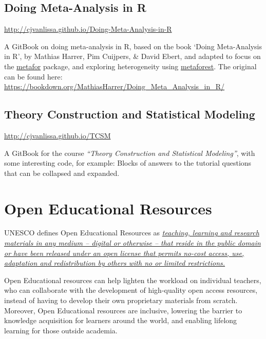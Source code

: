 \documentclass[
]{book}
\begin{document}
\hypertarget{doing-meta-analysis-in-r}{%
\section{Doing Meta-Analysis in R}\label{doing-meta-analysis-in-r}}

\url{http://cjvanlissa.github.io/Doing-Meta-Analysis-in-R}

A GitBook on doing meta-analysis in R, based on the book `Doing Meta-Analysis in R', by Mathias Harrer, Pim Cuijpers, \& David Ebert, and adapted to focus on the \href{https://cran.r-project.org/web/packages/metafor/index.html}{metafor} package, and exploring heterogeneity using \href{https://cran.r-project.org/web/packages/metaforest/index.html}{metaforest}. The original can be found here: \url{https://bookdown.org/MathiasHarrer/Doing_Meta_Analysis_in_R/}

\hypertarget{theory-construction-and-statistical-modeling}{%
\section{Theory Construction and Statistical Modeling}\label{theory-construction-and-statistical-modeling}}

\url{http://cjvanlissa.github.io/TCSM}

A GitBook for the course \emph{``Theory Construction and Statistical Modeling''}, with some interesting code, for example: Blocks of answers to the tutorial questions that can be collapsed and expanded.

\hypertarget{open-educational-resources}{%
\chapter{Open Educational Resources}\label{open-educational-resources}}

UNESCO defines Open Educational Resources as \href{https://en.unesco.org/themes/building-knowledge-societies/oer}{\emph{teaching, learning and research materials in any medium -- digital or otherwise -- that reside in the public domain or have been released under an open license that permits no-cost access, use, adaptation and redistribution by others with no or limited restrictions.}}

Open Educational resources can help lighten the workload on individual teachers, who can collaborate with the development of high-quality open access resources, instead of having to develop their own proprietary materials from scratch. Moreover, Open Educational resources are inclusive, lowering the barrier to knowledge acquisition for learners around the world, and enabling lifelong learning for those outside academia.
\end{document}
